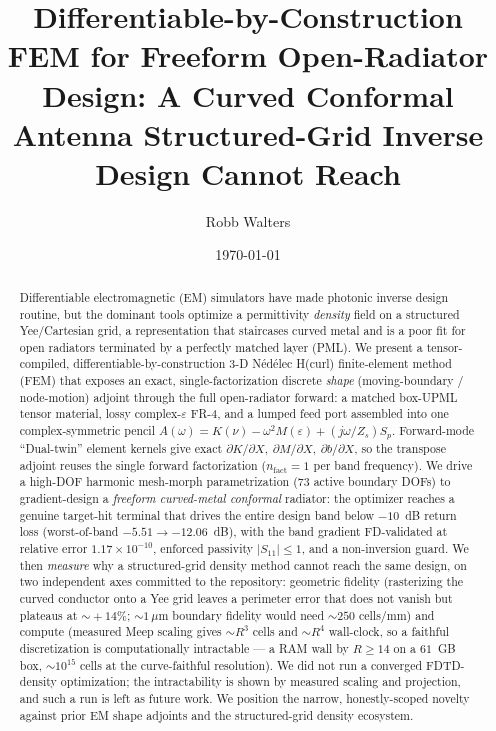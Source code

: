\documentclass{anvil-paper}
\title{Differentiable-by-Construction FEM for Freeform Open-Radiator Design:
A Curved Conformal Antenna Structured-Grid Inverse Design Cannot Reach}
\author{Robb Walters}
\date{\today}
\begin{document}
\maketitle

\begin{abstract}
Differentiable electromagnetic (EM) simulators have made photonic inverse
design routine, but the dominant tools optimize a permittivity \emph{density}
field on a structured Yee/Cartesian grid, a representation that staircases
curved metal and is a poor fit for open radiators terminated by a perfectly
matched layer (PML). We present a tensor-compiled, differentiable-by-construction
3-D N\'ed\'elec H(curl) finite-element method (FEM) that exposes an exact,
single-factorization discrete \emph{shape} (moving-boundary / node-motion)
adjoint through the full open-radiator forward: a matched box-UPML tensor
material, lossy complex-$\varepsilon$ FR-4, and a lumped feed port assembled into
one complex-symmetric pencil $A(\omega)=K(\nu)-\omega^2 M(\varepsilon)+(j\omega/Z_s)S_p$.
Forward-mode ``Dual-twin'' element kernels give exact
$\partial K/\partial X,\ \partial M/\partial X,\ \partial b/\partial X$, so the
transpose adjoint reuses the single forward factorization
($n_{\text{fact}}=1$ per band frequency). We drive a high-DOF harmonic
mesh-morph parametrization (73 active boundary DOFs) to gradient-design a
\emph{freeform curved-metal conformal} radiator: the optimizer reaches a genuine
target-hit terminal that drives the entire design band below $-10$~dB return
loss (worst-of-band $-5.51 \to -12.06$~dB), with the band gradient FD-validated
at relative error $1.17\times10^{-10}$, enforced passivity $|S_{11}|\le1$, and a
non-inversion guard. We then \emph{measure} why a structured-grid density method
cannot reach the same design, on two independent axes committed to the
repository: geometric fidelity (rasterizing the curved conductor onto a Yee grid
leaves a perimeter error that does not vanish but plateaus at $\sim\!+14\%$;
$\sim\!1\,\mu$m boundary fidelity would need $\sim\!250$ cells/mm) and compute
(measured Meep scaling gives $\sim\!R^3$ cells and $\sim\!R^4$ wall-clock, so a
faithful discretization is computationally intractable --- a RAM wall by
$R\!\ge\!14$ on a $61$~GB box, $\sim\!10^{15}$ cells at the curve-faithful
resolution). We did not run a converged FDTD-density optimization; the
intractability is shown by measured scaling and projection, and such a run is
left as future work. We position the narrow, honestly-scoped novelty against
prior EM shape adjoints and the structured-grid density ecosystem.
\end{abstract}
\end{document}

